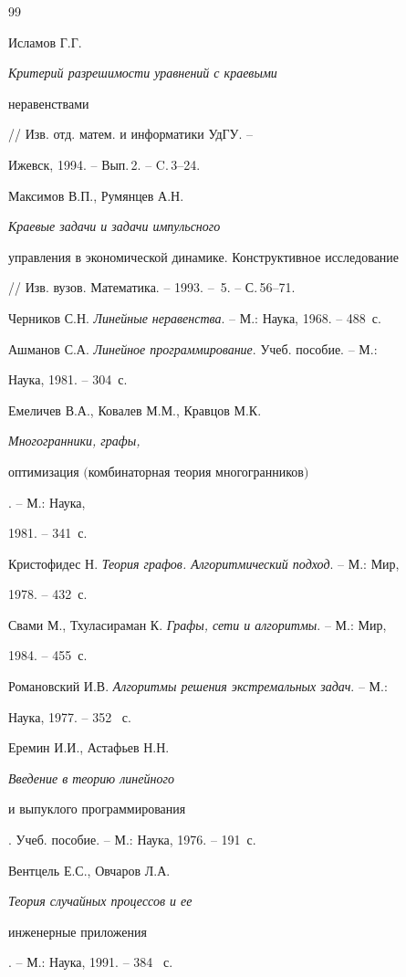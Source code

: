 \begin{thebibliography}{99}







Исламов Г.Г. {\em Критерий разрешимости уравнений с краевыми


неравенствами} // Изв. отд. матем. и информатики УдГУ. --


Ижевск, 1994. -- Вып.\,2. -- C.\,3--24.




Максимов В.П., Румянцев А.Н. {\em Краевые задачи и задачи импульсного


управления в экономической динамике. Конструктивное исследование}


// Изв. вузов. Математика. -- 1993. -- \No\,5. -- С.\,56--71.




Черников С.Н. {\em Линейные неравенства}. -- М.: Наука, 1968. -- 488~с.




Ашманов С.А. {\em Линейное программирование}. Учеб. пособие. -- М.:


Наука, 1981. -- 304~с.




Емеличев В.А., Ковалев М.М., Кравцов М.К. {\em Многогранники, графы,


оптимизация $($комбинаторная теория многогранников$)$}. -- М.: Наука,


1981. -- 341~с.




Кристофидес Н. {\em Теория графов. Алгоритмический подход}. -- М.: Мир,


1978. -- 432~с.




Свами М., Тхуласираман К. {\em Графы, сети и алгоритмы}. -- М.: Мир,


1984. -- 455~с.




Романовский И.В. {\em Алгоритмы решения экстремальных задач}. -- М.:


Наука, 1977. -- 352~ с.




Еремин И.И., Астафьев Н.Н. {\em Введение в теорию линейного


и выпуклого программирования}. Учеб. пособие. -- М.: Наука, 1976. -- 191~с.




Вентцель Е.С., Овчаров Л.А. {\em Теория случайных процессов и ее


инженерные приложения}. -- М.: Наука, 1991. -- 384~ с.





\end{thebibliography}





\vskip 2cm












\label{end}





